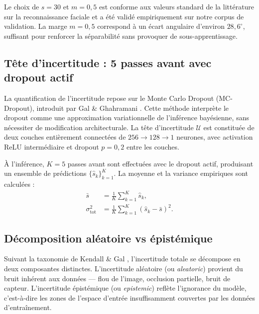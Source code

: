 \documentclass[12pt,a4paper]{report}
\begin{document}
Le choix de $s = 30$ et $m = 0{,}5$ est conforme aux valeurs standard de la litt\'{e}rature sur la reconnaissance faciale \cite{deng2019arcface} et a \'{e}t\'{e} valid\'{e} empiriquement sur notre corpus de validation. La marge $m = 0{,}5$ correspond \`{a} un \'{e}cart angulaire d'environ $28{,}6^{\circ}$, suffisant pour renforcer la s\'{e}parabilit\'{e} sans provoquer de sous-apprentissage.

\subsection{T\^{e}te d'incertitude : 5 passes avant avec dropout actif}

La quantification de l'incertitude repose sur le Monte Carlo Dropout (MC-Dropout), introduit par Gal \& Ghahramani \cite{gal2016dropout}. Cette m\'{e}thode interpr\`{e}te le dropout comme une approximation variationnelle de l'inf\'{e}rence bay\'{e}sienne, sans n\'{e}cessiter de modification architecturale. La t\^{e}te d'incertitude $\mathcal{U}$ est constitu\'{e}e de deux couches enti\`{e}rement connect\'{e}es de $256 \rightarrow 128 \rightarrow 1$ neurones, avec activation ReLU interm\'{e}diaire et dropout $p = 0{,}2$ entre les couches.

\`{A} l'inf\'{e}rence, $K = 5$ passes avant sont effectu\'{e}es avec le dropout actif, produisant un ensemble de pr\'{e}dictions $\{\hat{s}_k\}_{k=1}^K$. La moyenne et la variance empiriques sont calcul\'{e}es :
\begin{align}
\bar{s} &= \frac{1}{K} \sum_{k=1}^K \hat{s}_k, \\
\sigma^2_{\text{tot}} &= \frac{1}{K} \sum_{k=1}^K (\hat{s}_k - \bar{s})^2.
\end{align}

\subsection{D\'{e}composition al\'{e}atoire vs \'{e}pist\'{e}mique}

Suivant la taxonomie de Kendall \& Gal \cite{kendall2017uncertainties}, l'incertitude totale se d\'{e}compose en deux composantes distinctes. L'incertitude al\'{e}atoire (ou \emph{aleatoric}) provient du bruit inh\'{e}rent aux donn\'{e}es --- flou de l'image, occlusion partielle, bruit de capteur. L'incertitude \'{e}pist\'{e}mique (ou \emph{epistemic}) refl\`{e}te l'ignorance du mod\`{e}le, c'est-\`{a}-dire les zones de l'espace d'entr\'{e}e insuffisamment couvertes par les donn\'{e}es d'entra\^{i}nement.
\end{document}
